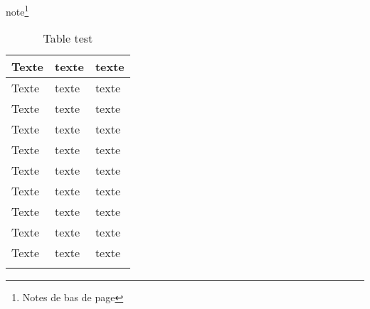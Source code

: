 \blindtext

\begin{landscape}
  note\footnote{Notes de bas de page}
  \Blindtext
\end{landscape}

\Blindtext

\begin{landscape}
  \begin{table}[p]
    \centering
    \begin{tabular}{m{5cm}m{5cm}m{2cm}}
      \firsthline
      Texte & texte & texte \\
      \hline
      Texte & texte & texte \\
      Texte & texte & texte \\
      Texte & texte & texte \\
      Texte & texte & texte \\
      Texte & texte & texte \\
      Texte & texte & texte \\
      Texte & texte & texte \\
      Texte & texte & texte \\
      Texte & texte & texte \\
      \lasthline
    \end{tabular}
    \caption{Table test}
  \end{table}
\end{landscape}